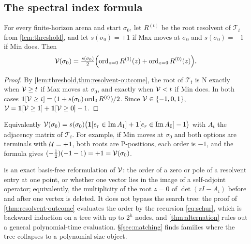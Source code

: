 \subsection{The spectral index formula}
\begin{corollary}\label{cor:index}
For every finite-horizon arena and start $\sigma_0$, let $R^{(t)}$ be the root resolvent of $\mathcal T_t$ from \cref{lem:threshold}, and let $s(\sigma_0)=+1$ if Max moves at $\sigma_0$ and $s(\sigma_0)=-1$ if Min does. Then
\[
\mathcal{V}(\sigma_0)=\tfrac{s(\sigma_0)}2\Bigl(\operatorname{ord}_{z=0}R^{(1)}(z)+\operatorname{ord}_{z=0}R^{(0)}(z)\Bigr).
\]
\end{corollary}

\begin{proof}
By \cref{lem:threshold,thm:resolvent-outcome}, the root of $\mathcal T_t$ is N exactly when $\mathcal{V}\ge t$ if Max moves at $\sigma_0$, and exactly when $\mathcal{V}<t$ if Min does. In both cases $\mathbf{1}[\mathcal{V}\ge t]=(1+s(\sigma_0)\operatorname{ord}_0R^{(t)})/2$. Since $\mathcal{V}\in\{-1,0,1\}$, $\mathcal{V}=\mathbf{1}[\mathcal{V}\ge1]+\mathbf{1}[\mathcal{V}\ge0]-1$.
\end{proof}

Equivalently $\mathcal{V}(\sigma_0)=s(\sigma_0)\bigl(\mathbf{1}[e_r\in\operatorname{Im}A_1]+\mathbf{1}[e_r\in\operatorname{Im}A_0]-1\bigr)$ with $A_t$ the adjacency matrix of $\mathcal T_t$. For example, if Min moves at $\sigma_0$ and both options are terminals with $\mathcal{U}=+1$, both roots are P-positions, each order is $-1$, and the formula gives $(-\frac12)(-1-1)=+1=\mathcal{V}(\sigma_0)$.

\begin{remark}\label{rem:index}
 is an exact basis-free reformulation of $\mathcal{V}$: the order of a zero or pole of a resolvent entry at one point, or whether one vector lies in the image of a self-adjoint operator; equivalently, the multiplicity of the root $z=0$ of $\det(zI-A_t)$ before and after one vertex is deleted. It does not bypass the search tree: the proof of \cref{thm:resolvent-outcome} evaluates the order by the recursion \eqref{eq:schur}, which is backward induction on a tree with up to $2^h$ nodes, and \cref{thm:alternation} rules out a general polynomial-time evaluation. \S\ref{sec:matching} finds families where the tree collapses to a polynomial-size object.
\end{remark}
